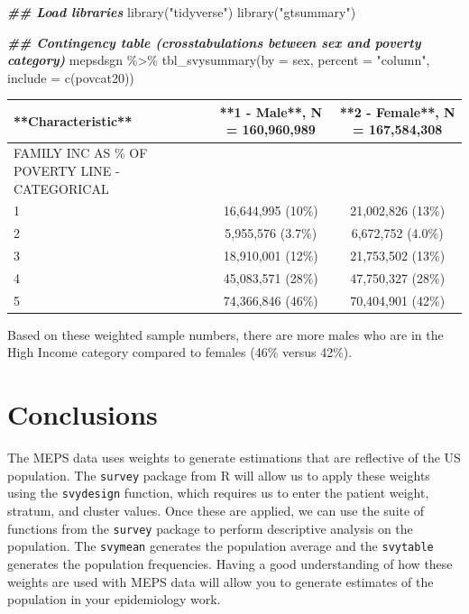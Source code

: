 \documentclass[
]{book}
\newenvironment{Shaded}{\begin{snugshade}}{\end{snugshade}}
\newcommand{\AttributeTok}[1]{\textcolor[rgb]{0.77,0.63,0.00}{#1}}
\newcommand{\DocumentationTok}[1]{\textcolor[rgb]{0.56,0.35,0.01}{\textbf{\textit{#1}}}}
\newcommand{\FunctionTok}[1]{\textcolor[rgb]{0.00,0.00,0.00}{#1}}
\newcommand{\NormalTok}[1]{#1}
\newcommand{\SpecialCharTok}[1]{\textcolor[rgb]{0.00,0.00,0.00}{#1}}
\newcommand{\StringTok}[1]{\textcolor[rgb]{0.31,0.60,0.02}{#1}}
\begin{document}
\begin{Shaded}
\begin{Highlighting}[]
\DocumentationTok{\#\# Load libraries }
\FunctionTok{library}\NormalTok{(}\StringTok{"tidyverse"}\NormalTok{)}
\FunctionTok{library}\NormalTok{(}\StringTok{"gtsummary"}\NormalTok{)}

\DocumentationTok{\#\# Contingency table (crosstabulations between sex and poverty category)}
\NormalTok{mepsdsgn }\SpecialCharTok{\%\textgreater{}\%}
  \FunctionTok{tbl\_svysummary}\NormalTok{(}\AttributeTok{by =}\NormalTok{ sex, }\AttributeTok{percent =} \StringTok{"column"}\NormalTok{, }\AttributeTok{include =} \FunctionTok{c}\NormalTok{(povcat20))}
\end{Highlighting}
\end{Shaded}

\begin{tabular}{l|c|c}
\hline
**Characteristic** & **1 - Male**, N = 160,960,989 & **2 - Female**, N = 167,584,308\\
\hline
FAMILY INC AS \% OF POVERTY LINE - CATEGORICAL &  & \\
\hline
1 & 16,644,995 (10\%) & 21,002,826 (13\%)\\
\hline
2 & 5,955,576 (3.7\%) & 6,672,752 (4.0\%)\\
\hline
3 & 18,910,001 (12\%) & 21,753,502 (13\%)\\
\hline
4 & 45,083,571 (28\%) & 47,750,327 (28\%)\\
\hline
5 & 74,366,846 (46\%) & 70,404,901 (42\%)\\
\hline
\end{tabular}

Based on these weighted sample numbers, there are more males who are in the High Income category compared to females (46\% versus 42\%).

\hypertarget{conclusions-2}{%
\section{Conclusions}\label{conclusions-2}}

The MEPS data uses weights to generate estimations that are reflective of the US population. The \texttt{survey} package from R will allow us to apply these weights using the \texttt{svydesign} function, which requires us to enter the patient weight, stratum, and cluster values. Once these are applied, we can use the suite of functions from the \texttt{survey} package to perform descriptive analysis on the population. The \texttt{svymean} generates the population average and the \texttt{svytable} generates the population frequencies. Having a good understanding of how these weights are used with MEPS data will allow you to generate estimates of the population in your epidemiology work.
\end{document}
